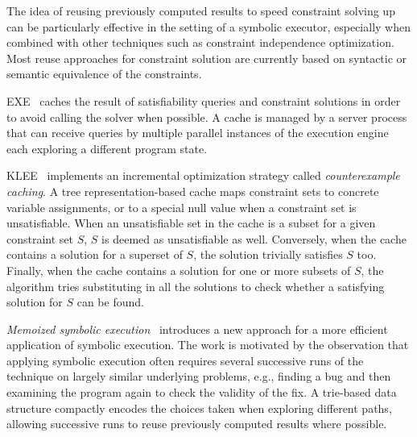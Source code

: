 

The idea of reusing previously computed results to speed constraint solving up can be particularly effective in the setting of a symbolic executor, especially when combined with other techniques such as constraint independence optimization. Most reuse approaches for constraint solution are currently based on syntactic or semantic equivalence of the constraints.

{\sc EXE}~\cite{EXE-CCS06} caches the result of satisfiability queries and constraint solutions in order to avoid calling the solver when possible. A cache is managed by a server process that can receive queries by multiple parallel instances of the execution engine each exploring a different program state.

{\sc KLEE}~\cite{KLEE-OSDI08} implements an incremental optimization strategy called {\em counterexample caching}. A tree representation-based cache maps constraint sets to concrete variable assignments, or to a special null value when a constraint set is unsatisfiable. When an unsatisfiable set in the cache is a subset for a given constraint set $S$, $S$ is deemed as unsatisfiable as well. Conversely, when the cache contains a solution for a superset of $S$, the solution trivially satisfies $S$ too. Finally, when the cache contains a solution for one or more subsets of $S$, the algorithm tries substituting in all the solutions to check whether a satisfying solution for $S$ can be found.

{\em Memoized symbolic execution}~\cite{MEMO-ISSTA12} introduces a new approach for a more efficient application of symbolic execution. The work is motivated by the observation that applying symbolic execution often requires several successive runs of the technique on largely similar underlying problems, e.g., finding a bug and then examining the program again to check the validity of the fix. A trie-based data structure compactly encodes the choices taken when exploring different paths, allowing successive runs to reuse previously computed results where possible.

